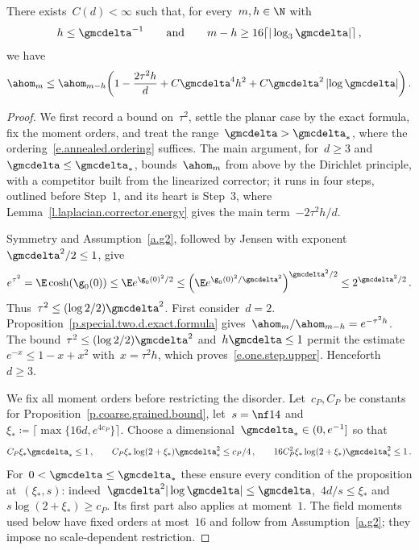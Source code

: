 \documentclass[11pt]{amsart}
\begin{document}
\begin{lemma}
	\label{l.one.step.upper}
	There exists~$C(d) < \infty$ such that, for every~$m,h\in\N$ with
	\begin{equation*}
		h\leq\gmcdelta^{-1}
		\qquad\text{and}\qquad
		m-h\geq16\lceil|\log_3\gmcdelta|\rceil\,,
	\end{equation*}
	we have
	\begin{equation}
		\ahom_m \leq \ahom_{m-h}  \biggl(1 - \frac{2 \tau^2 h}{d} + C\gmcdelta^4 h^{2}  + C \gmcdelta^2 \left|\log \gmcdelta\right| \biggr)  \,.
		\label{e.one.step.upper}
	\end{equation}
\end{lemma}

\begin{proof}
We first record a bound on~$\tau^2$, settle the planar case by the exact formula, fix the moment orders, and treat the range~$\gmcdelta>\gmcdelta_*$, where the ordering~\eqref{e.annealed.ordering} suffices. The main argument, for~$d\geq3$ and~$\gmcdelta\leq\gmcdelta_*$, bounds~$\ahom_m$ from above by the Dirichlet principle, with a competitor built from the linearized corrector; it runs in four steps, outlined before Step~1, and its heart is Step~3, where Lemma~\ref{l.laplacian.corrector.energy} gives the main term~$-2\tau^2h/d$.

\smallskip

Symmetry and Assumption~\ref{a.g2}, followed by Jensen with exponent~$\gmcdelta^2/2\leq1$, give
\begin{equation*}
	e^{\tau^2}=\E\cosh(\g_0(0))
	\leq\E e^{\g_0(0)^2/2}
	\leq\left(\E e^{\g_0(0)^2/\gmcdelta^2}\right)^{\gmcdelta^2/2}
	\leq2^{\gmcdelta^2/2}\,.
\end{equation*}
Thus~$\tau^2\leq(\log2/2)\gmcdelta^2$. First consider~$d=2$. Proposition~\ref{p.special.two.d.exact.formula} gives~$\ahom_m/\ahom_{m-h}=e^{-\tau^2h}$. The bound~$\tau^2\leq(\log2/2)\gmcdelta^2$ and~$h\gmcdelta\leq1$ permit the estimate~$e^{-x}\leq1-x+x^2$ with~$x=\tau^2h$, which proves~\eqref{e.one.step.upper}. Henceforth~$d\geq3$.

\smallskip

We fix all moment orders before restricting the disorder. Let~$c_P,C_P$ be constants for Proposition~\ref{p.coarse.grained.bound}, let~$s=\nf14$ and~$\xi_*\coloneqq\lceil\max\{16d,e^{4c_P}\}\rceil$. Choose a dimensional~$\gmcdelta_*\in(0,e^{-1}]$ so that
\begin{equation*}
	C_P\xi_*\gmcdelta_*\leq1\,,\qquad
	C_P\xi_*\log(2+\xi_*)\gmcdelta_*^2\leq c_P/4\,,\qquad
	16C_P^2\xi_*\log(2+\xi_*)\gmcdelta_*^2\leq1\,.
\end{equation*}
For~$0<\gmcdelta\leq\gmcdelta_*$ these ensure every condition of the proposition at~$(\xi_*,s)$: indeed~$\gmcdelta^2|\log\gmcdelta|\leq\gmcdelta$,~$4d/s\leq\xi_*$ and~$s\log(2+\xi_*)\geq c_P$. Its first part also applies at moment~$1$. The field moments used below have fixed orders at most~$16$ and follow from Assumption~\ref{a.g2}; they impose no scale-dependent restriction.


\end{proof}
\end{document}
